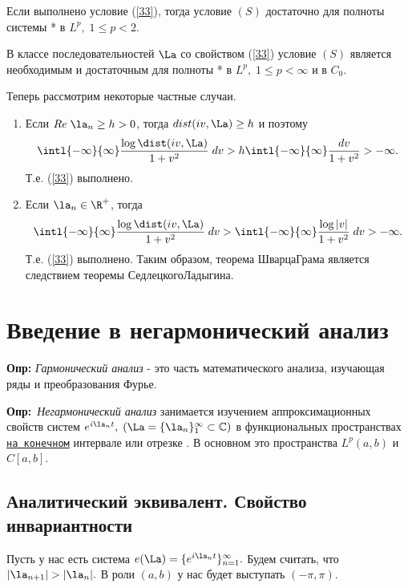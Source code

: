 \documentclass[a4paper]{article}
\def\defin{\noindent\textbf{Опр:}\ }
\begin{document}
\begin{theorems}[Ладыгин]
Если выполнено условие (\ref{33}), тогда условие $(S)$ достаточно
для полноты системы * в $L^p,\;1\le p<2.$
\end{theorems}

\begin{sled}
В классе последовательностей $\La$ со свойством (\ref{33})
условие $(S)$ является необходимым и достаточным для полноты * в
$L^p,\;1\le p<\infty$ и в $C_0.$
\end{sled}

Теперь рассмотрим некоторые частные случаи.

\begin{enumerate}
\item
Если $Re\;\la_n\ge h>0$, тогда $dist(iv,\La)\ge h$ и
поэтому
$$\intl{-\infty}{\infty}\frac{\log
\dist(iv,\La)}{1+v^2}\;dv>h\intl{-\infty}{\infty}\frac{dv}{1+v^2}>-\infty.$$
Т.е. (\ref{33}) выполнено.
\item
Если $\la_n\in\R ^{+}$, тогда
$$\intl{-\infty}{\infty}\frac{\log
\dist(iv,\La)}{1+v^2}\;dv>\intl{-\infty}{\infty}\frac{\log
|v|}{1+v^2}\;dv>-\infty.$$ Т.е. (\ref{33}) выполнено. Таким
образом, теорема Шварца\ч Грама является следствием теоремы
Седлецкого\ч Ладыгина.
\end{enumerate}


\newpage
\section{Введение в негармонический анализ}
\textbf{Опр:} \emph{Гармонический анализ} - это часть
математического анализа, изучающая ряды и преобразования Фурье.

\defin \emph{Негармонический анализ} занимается
изучением аппроксимационных свойств систем $e^{i\la_nt},\;
(\La=\{\la_n\}_1^{\infty}\subset \mathbb{C})$ в
функциональных пространствах \underline{\texttt{на конечном}}
интервале или отрезке . В основном это пространства $L^p(a,b)$ и
$C[a,b]$.

\subsection{Аналитический эквивалент. Свойство инвариантности}

Пусть у нас есть система
$e(\La)=\{e^{i\la_nt}\}_{n=1}^{\infty}.$ Будем считать,
что $|\la_{n+1}|>|\la_n|.$ В роли $(a,b)$ у нас будет
выступать $(-\pi,\pi).$
\end{document}
